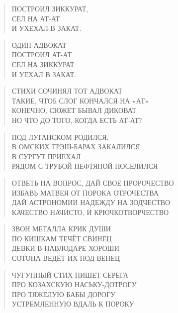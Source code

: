 \poemtitle{***}
\begin{verse}
ПОСТРОИЛ ЗИККУРАТ,\\
СЕЛ НА АТ-АТ\\
И УХЕХАЛ В ЗАКАТ.
\end{verse}

\poemtitle{***}
\begin{verse}
ОДИН АДВОКАТ\\
ПОСТРОИЛ АТ-АТ\\
СЕЛ НА ЗИККУРАТ\\
И УЕХАЛ В ЗАКАТ.
\end{verse}

\poemtitle{***}
\begin{verse}
СТИХИ СОЧИНЯЛ ТОТ АДВОКАТ\\
ТАКИЕ, ЧТОБ СЛОГ КОНЧАЛСЯ НА «АТ»\\
КОНЕЧНО, СЮЖЕТ  БЫВАЛ ДИКОВАТ\\
НО ЧТО ДО ТОГО, КОГДА ЕСТЬ АТ-АТ?
\end{verse}

\poemtitle{***}
\begin{verse}
ПОД ЛУГАНСКОМ РОДИЛСЯ, \\
В ОМСКИХ ТРЭШ-БАРАХ ЗАКАЛИЛСЯ\\
В СУРГУТ ПРИЕХАЛ\\
РЯДОМ С ТРУБОЙ НЕФТЯНОЙ ПОСЕЛИЛСЯ
\end{verse}

\poemtitle{***}
\begin{verse}
ОТВЕТЬ НА ВОПРОС, ДАЙ СВОЕ ПРОРОЧЕСТВО\\
ИЗБАВЬ МАТВЕЯ ОТ ПОРОКА ОТРОЧЕСТВА\\
ДАЙ АСТРОНОМИИ НАДЕЖДУ НА ЗОДЧЕСТВО\\
КАЧЕСТВО НАЧИСТО, И КРЮЧКОТВОРЧЕСТВО
\end{verse}

\poemtitle{***}
\begin{verse}
ЗВОН МЕТАЛЛА КРИК ДУШИ\\
ПО КИШКАМ ТЕЧЁТ СВИНЕЦ\\
ДЕВКИ В ПАВЛОДАРЕ ХОРОШИ\\
СОТОНА ВЕДЁТ ИХ ПОД ВЕНЕЦ
\end{verse}

\poemtitle{***}
\begin{verse}
ЧУГУННЫЙ СТИХ ПИШЕТ СЕРЕГА\\
ПРО КОЗАХСКУЮ НАСЬКУ-ДОТРОГУ\\
ПРО ТЯЖЕЛУЮ БАБЫ ДОРОГУ\\
УСТРЕМЛЕННУЮ ВДАЛЬ К ПОРОКУ
\end{verse}

